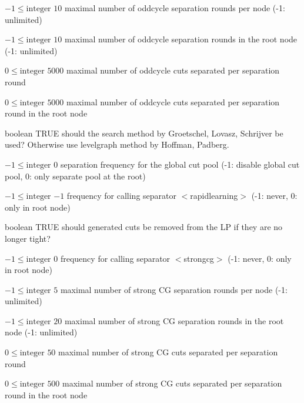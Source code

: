 %
{$-1\leq\textrm{integer}$}%
{$10$}%
{maximal number of oddcycle separation rounds per node (-1: unlimited)}%
{}

%
{$-1\leq\textrm{integer}$}%
{$10$}%
{maximal number of oddcycle separation rounds in the root node (-1: unlimited)}%
{}

%
{$0\leq\textrm{integer}$}%
{$5000$}%
{maximal number of oddcycle cuts separated per separation round}%
{}

%
{$0\leq\textrm{integer}$}%
{$5000$}%
{maximal number of oddcycle cuts separated per separation round in the root node}%
{}

%
{boolean}%
{TRUE}%
{should the search method by Groetschel, Lovasz, Schrijver be used? Otherwise use levelgraph method by Hoffman, Padberg.}%
{}

%
{$-1\leq\textrm{integer}$}%
{$0$}%
{separation frequency for the global cut pool (-1: disable global cut pool, 0: only separate pool at the root)}%
{}

%
{$-1\leq\textrm{integer}$}%
{$-1$}%
{frequency for calling separator $<$rapidlearning$>$ (-1: never, 0: only in root node)}%
{}

%
{boolean}%
{TRUE}%
{should generated cuts be removed from the LP if they are no longer tight?}%
{}

%
{$-1\leq\textrm{integer}$}%
{$0$}%
{frequency for calling separator $<$strongcg$>$ (-1: never, 0: only in root node)}%
{}

%
{$-1\leq\textrm{integer}$}%
{$5$}%
{maximal number of strong CG separation rounds per node (-1: unlimited)}%
{}

%
{$-1\leq\textrm{integer}$}%
{$20$}%
{maximal number of strong CG separation rounds in the root node (-1: unlimited)}%
{}

%
{$0\leq\textrm{integer}$}%
{$50$}%
{maximal number of strong CG cuts separated per separation round}%
{}

%
{$0\leq\textrm{integer}$}%
{$500$}%
{maximal number of strong CG cuts separated per separation round in the root node}%
{}

